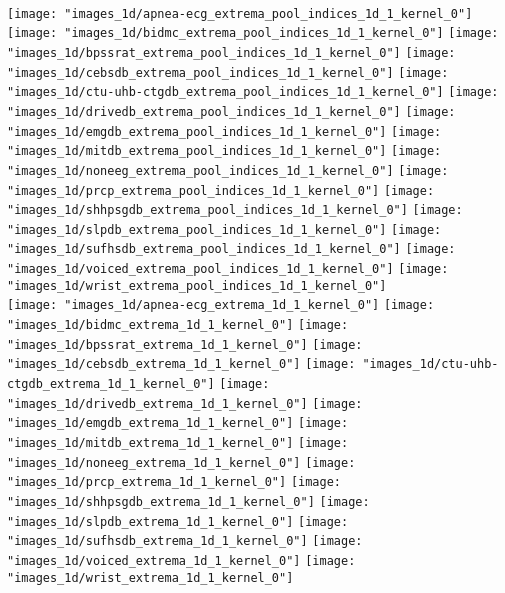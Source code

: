 		\\
			\texttt{[image: "images\_1d/apnea-ecg\_extrema\_pool\_indices\_1d\_1\_kernel\_0"]}
			\texttt{[image: "images\_1d/bidmc\_extrema\_pool\_indices\_1d\_1\_kernel\_0"]}
			\texttt{[image: "images\_1d/bpssrat\_extrema\_pool\_indices\_1d\_1\_kernel\_0"]}
			\texttt{[image: "images\_1d/cebsdb\_extrema\_pool\_indices\_1d\_1\_kernel\_0"]}
			\texttt{[image: "images\_1d/ctu-uhb-ctgdb\_extrema\_pool\_indices\_1d\_1\_kernel\_0"]}
			\texttt{[image: "images\_1d/drivedb\_extrema\_pool\_indices\_1d\_1\_kernel\_0"]}
			\texttt{[image: "images\_1d/emgdb\_extrema\_pool\_indices\_1d\_1\_kernel\_0"]}
			\texttt{[image: "images\_1d/mitdb\_extrema\_pool\_indices\_1d\_1\_kernel\_0"]}
			\texttt{[image: "images\_1d/noneeg\_extrema\_pool\_indices\_1d\_1\_kernel\_0"]}
			\texttt{[image: "images\_1d/prcp\_extrema\_pool\_indices\_1d\_1\_kernel\_0"]}
			\texttt{[image: "images\_1d/shhpsgdb\_extrema\_pool\_indices\_1d\_1\_kernel\_0"]}
			\texttt{[image: "images\_1d/slpdb\_extrema\_pool\_indices\_1d\_1\_kernel\_0"]}
			\texttt{[image: "images\_1d/sufhsdb\_extrema\_pool\_indices\_1d\_1\_kernel\_0"]}
			\texttt{[image: "images\_1d/voiced\_extrema\_pool\_indices\_1d\_1\_kernel\_0"]}
			\texttt{[image: "images\_1d/wrist\_extrema\_pool\_indices\_1d\_1\_kernel\_0"]}
			\\
				\texttt{[image: "images\_1d/apnea-ecg\_extrema\_1d\_1\_kernel\_0"]}
				\texttt{[image: "images\_1d/bidmc\_extrema\_1d\_1\_kernel\_0"]}
				\texttt{[image: "images\_1d/bpssrat\_extrema\_1d\_1\_kernel\_0"]}
				\texttt{[image: "images\_1d/cebsdb\_extrema\_1d\_1\_kernel\_0"]}
				\texttt{[image: "images\_1d/ctu-uhb-ctgdb\_extrema\_1d\_1\_kernel\_0"]}
				\texttt{[image: "images\_1d/drivedb\_extrema\_1d\_1\_kernel\_0"]}
				\texttt{[image: "images\_1d/emgdb\_extrema\_1d\_1\_kernel\_0"]}
				\texttt{[image: "images\_1d/mitdb\_extrema\_1d\_1\_kernel\_0"]}
				\texttt{[image: "images\_1d/noneeg\_extrema\_1d\_1\_kernel\_0"]}
				\texttt{[image: "images\_1d/prcp\_extrema\_1d\_1\_kernel\_0"]}
				\texttt{[image: "images\_1d/shhpsgdb\_extrema\_1d\_1\_kernel\_0"]}
				\texttt{[image: "images\_1d/slpdb\_extrema\_1d\_1\_kernel\_0"]}
				\texttt{[image: "images\_1d/sufhsdb\_extrema\_1d\_1\_kernel\_0"]}
				\texttt{[image: "images\_1d/voiced\_extrema\_1d\_1\_kernel\_0"]}
				\texttt{[image: "images\_1d/wrist\_extrema\_1d\_1\_kernel\_0"]}
